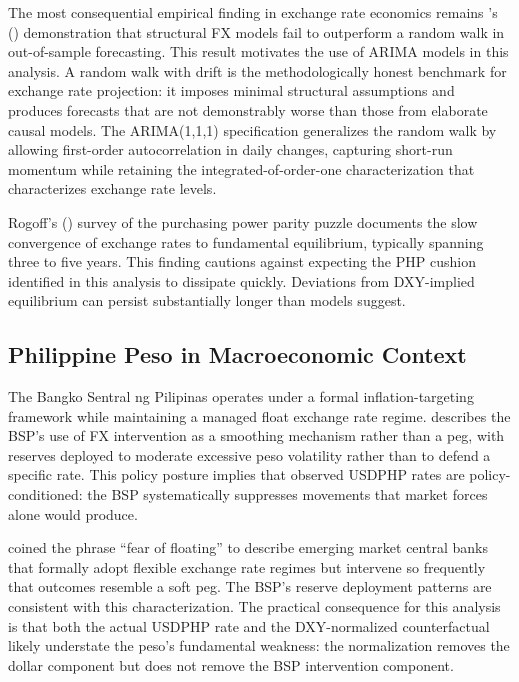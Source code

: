 \documentclass[12pt]{article}
\begin{document}
The most consequential empirical finding in exchange rate economics remains
\citeauthor{meese1983}'s (\citeyear{meese1983}) demonstration that structural FX models
fail to outperform a random walk in out-of-sample forecasting. This result motivates
the use of ARIMA models in this analysis. A random walk with drift is the
methodologically honest benchmark for exchange rate projection: it imposes minimal
structural assumptions and produces forecasts that are not demonstrably worse than
those from elaborate causal models. The ARIMA(1,1,1) specification generalizes the
random walk by allowing first-order autocorrelation in daily changes, capturing
short-run momentum while retaining the integrated-of-order-one characterization that
characterizes exchange rate levels.

Rogoff's (\citeyear{rogoff1996}) survey of the purchasing power parity puzzle documents
the slow convergence of exchange rates to fundamental equilibrium, typically spanning
three to five years. This finding cautions against expecting the PHP cushion identified
in this analysis to dissipate quickly. Deviations from DXY-implied equilibrium can
persist substantially longer than models suggest.

\subsection{Philippine Peso in Macroeconomic Context}

The Bangko Sentral ng Pilipinas operates under a formal inflation-targeting framework
while maintaining a managed float exchange rate regime. \citet{guinigundo2014} describes
the BSP's use of FX intervention as a smoothing mechanism rather than a peg,
with reserves deployed to moderate excessive peso volatility rather than to defend a
specific rate. This policy posture implies that observed USDPHP rates are policy-
conditioned: the BSP systematically suppresses movements that market forces alone would
produce.

\citet{calvo2002} coined the phrase ``fear of floating'' to describe emerging market
central banks that formally adopt flexible exchange rate regimes but intervene so
frequently that outcomes resemble a soft peg. The BSP's reserve deployment patterns
are consistent with this characterization. The practical consequence for this analysis
is that both the actual USDPHP rate and the DXY-normalized counterfactual likely
understate the peso's fundamental weakness: the normalization removes the dollar
component but does not remove the BSP intervention component.
\end{document}
